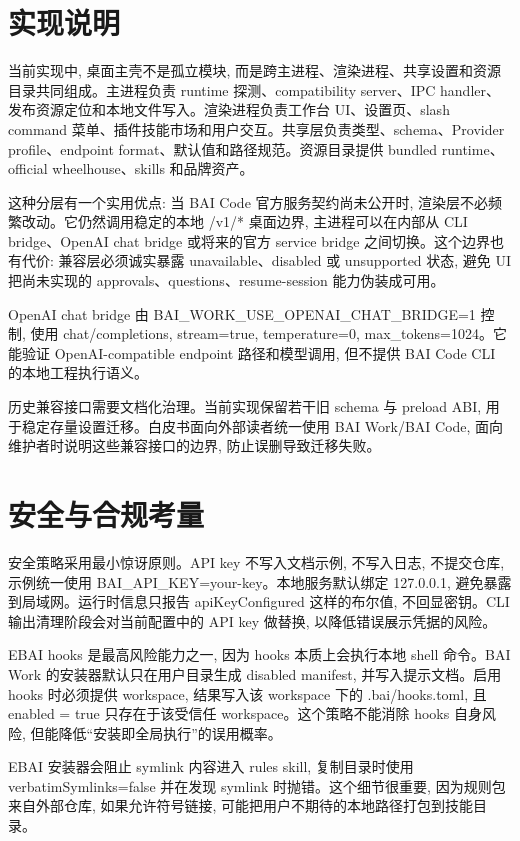 \section{实现说明}
当前实现中, 桌面主壳不是孤立模块, 而是跨主进程、渲染进程、共享设置和资源目录共同组成。主进程负责 runtime 探测、compatibility server、IPC handler、发布资源定位和本地文件写入。渲染进程负责工作台 UI、设置页、slash command 菜单、插件技能市场和用户交互。共享层负责类型、schema、Provider profile、endpoint format、默认值和路径规范。资源目录提供 bundled runtime、official wheelhouse、skills 和品牌资产。

这种分层有一个实用优点: 当 BAI Code 官方服务契约尚未公开时, 渲染层不必频繁改动。它仍然调用稳定的本地 /v1/* 桌面边界, 主进程可以在内部从 CLI bridge、OpenAI chat bridge 或将来的官方 service bridge 之间切换。这个边界也有代价: 兼容层必须诚实暴露 unavailable、disabled 或 unsupported 状态, 避免 UI 把尚未实现的 approvals、questions、resume-session 能力伪装成可用。

OpenAI chat bridge 由 BAI\_WORK\_USE\_OPENAI\_CHAT\_BRIDGE=1 控制, 使用 chat/completions, stream=true, temperature=0, max\_tokens=1024。它能验证 OpenAI-compatible endpoint 路径和模型调用, 但不提供 BAI Code CLI 的本地工程执行语义。

历史兼容接口需要文档化治理。当前实现保留若干旧 schema 与 preload ABI, 用于稳定存量设置迁移。白皮书面向外部读者统一使用 BAI Work/BAI Code, 面向维护者时说明这些兼容接口的边界, 防止误删导致迁移失败。

\section{安全与合规考量}
安全策略采用最小惊讶原则。API key 不写入文档示例, 不写入日志, 不提交仓库, 示例统一使用 BAI\_API\_KEY=your-key。本地服务默认绑定 127.0.0.1, 避免暴露到局域网。运行时信息只报告 apiKeyConfigured 这样的布尔值, 不回显密钥。CLI 输出清理阶段会对当前配置中的 API key 做替换, 以降低错误展示凭据的风险。

EBAI hooks 是最高风险能力之一, 因为 hooks 本质上会执行本地 shell 命令。BAI Work 的安装器默认只在用户目录生成 disabled manifest, 并写入提示文档。启用 hooks 时必须提供 workspace, 结果写入该 workspace 下的 .bai/hooks.toml, 且 enabled = true 只存在于该受信任 workspace。这个策略不能消除 hooks 自身风险, 但能降低“安装即全局执行”的误用概率。

EBAI 安装器会阻止 symlink 内容进入 rules skill, 复制目录时使用 verbatimSymlinks=false 并在发现 symlink 时抛错。这个细节很重要, 因为规则包来自外部仓库, 如果允许符号链接, 可能把用户不期待的本地路径打包到技能目录。

